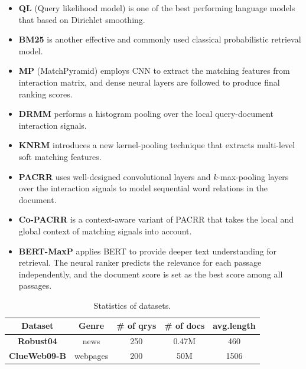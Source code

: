 \begin{itemize}
    \item \textbf{QL} (Query likelihood model) \cite{zhai2004study} is one of the best performing language models that based on Dirichlet smoothing.
    \item \textbf{BM25} \cite{robertson1994some} is another effective and commonly used classical probabilistic retrieval model.
    \item \textbf{MP} (MatchPyramid) \cite{pang2016text} employs CNN to extract the matching features from interaction matrix, and dense neural layers are followed to produce final ranking scores.
    \item \textbf{DRMM} \cite{guo2016deep} performs a histogram pooling over the local query-document interaction signals. 
    \item \textbf{KNRM} \cite{xiong2017end} introduces a new kernel-pooling technique that extracts multi-level soft matching features.
    \item \textbf{PACRR} \cite{hui2017pacrr} uses well-designed convolutional layers and $k$-max-pooling layers over the interaction signals to model sequential word relations in the document.
    \item \textbf{Co-PACRR} \cite{hui2018co} is a context-aware variant of PACRR that takes the local and global context of matching signals into account.
    \item \textbf{BERT-MaxP} \cite{dai2019deeper} applies BERT to provide deeper text understanding for retrieval. The neural ranker predicts the relevance for each passage independently, and the document score is set as the best score among all passages.
\end{itemize}


\begin{table}[]
	\footnotesize
	\begin{tabular}{@{}ccccc@{}}
		\toprule
		\textbf{Dataset}     & \textbf{Genre} & \textbf{\# of qrys} & \textbf{\# of docs} & \textbf{avg.length} \\ \midrule
		\textbf{Robust04}    & news           & 250                 & 0.47M                & 460                         \\
		\textbf{ClueWeb09-B} & webpages       & 200                 & 50M                 & 1506                        \\ \bottomrule
	\end{tabular}
	\caption{Statistics of datasets.}
	\label{tab:1}
\end{table}


